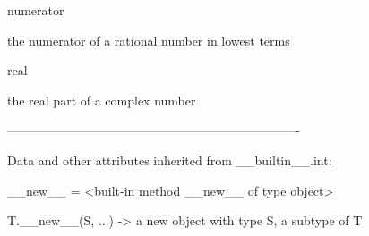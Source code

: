 \documentclass[letterpaper,10pt,english]{sphinxmanual}
\begin{document}
\begin{description}
\begin{description}
\begin{DUlineblock}{0em}
\begin{DUlineblock}{\DUlineblockindent}
\end{DUlineblock}
\item[] numerator
\item[]
\begin{DUlineblock}{\DUlineblockindent}
\item[] the numerator of a rational number in lowest terms
\item[] 
\end{DUlineblock}
\item[] real
\item[]
\begin{DUlineblock}{\DUlineblockindent}
\item[] the real part of a complex number
\item[] 
\end{DUlineblock}
\item[] ----------------------------------------------------------------------
\item[] Data and other attributes inherited from \_\_builtin\_\_.int:
\item[] 
\item[] \_\_new\_\_ = \textless{}built-in method \_\_new\_\_ of type object\textgreater{}
\item[]
\begin{DUlineblock}{\DUlineblockindent}
\item[] T.\_\_new\_\_(S, ...) -\textgreater{} a new object with type S, a subtype of T
\end{DUlineblock}
\end{DUlineblock}


\end{description}
\end{description}
\end{document}

